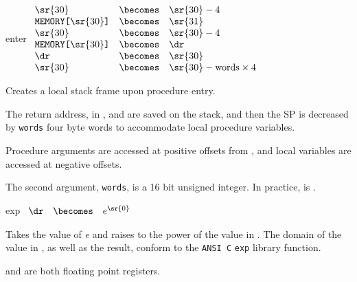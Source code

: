 \begin{instruction}{enter}\label{inst:enter}
  {
    \begin{math}
      \begin{array}{lcl}
                                  \sr{30} & \becomes &  \sr{30} - 4 \\
        \texttt{MEMORY[\textrm{\sr{30}}]} & \becomes &  \sr{31} \\
                                  \sr{30} & \becomes &  \sr{30} - 4 \\
        \texttt{MEMORY[\textrm{\sr{30}}]} & \becomes &  \dr \\
                                      \dr & \becomes &  \sr{30} \\
                                  \sr{30} & \becomes &  \sr{30} - \textrm{words} \times 4 \\
      \end{array}
    \end{math}
  }
  {
    Creates a local stack frame upon procedure entry.

    The return address, in , and \dr are saved on the stack,
    and then the \ac{SP} is decreased by \texttt{words} four byte
    words to accommodate local procedure variables.

    Procedure arguments are accessed at positive offsets from \dr, and
    local variables are accessed at negative offsets.

    The second argument, \texttt{words}, is a 16 bit unsigned
    integer. In practice, \dr is .
  }
\end{instruction}



%
%



\begin{instruction}{exp}
     {\expopc}
     {
       \begin{math}
         \begin{array}{lcl}
           \dr & \becomes & $$e^{\sr{0}}$$
         \end{array}
       \end{math}
     }
     {Takes the value of \emph{e} and raises to the power of the value
     in .  The domain of the value in \texttt{}, as well
     as the result, conform to the \texttt{ANSI C} \texttt{exp}
     library function.

      and \dr are both floating point registers.}
\end{instruction}


